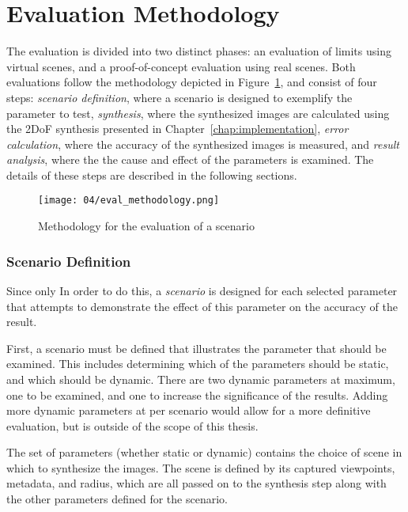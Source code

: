 
\section{Evaluation Methodology}
The evaluation is divided into two distinct phases: an evaluation of limits using virtual scenes, and a proof-of-concept evaluation using real scenes. Both evaluations follow the methodology depicted in Figure~\ref{fig:eval-methodology}, and consist of four steps: \emph{scenario definition}, where a scenario is designed to exemplify the parameter to test, \emph{synthesis}, where the synthesized images are calculated using the 2DoF synthesis presented in Chapter~\ref{chap:implementation}, \emph{error calculation}, where the accuracy of the synthesized images is measured, and \emph{result analysis}, where the the cause and effect of the parameters is examined. The details of these steps are described in the following sections.

\begin{figure}
		\centering
		\texttt{[image: 04/eval\_methodology.png]}
		\caption{Methodology for the evaluation of a scenario}
		\label{fig:eval-methodology}
\end{figure}

\subsubsection{Scenario Definition}
Since only In order to do this, a \emph{scenario} is designed for each selected parameter that attempts to demonstrate the effect of this parameter on the accuracy of the result.

First, a scenario must be defined that illustrates the parameter that should be examined. This includes determining which of the parameters should be static, and which should be dynamic. There are two dynamic parameters at maximum, one to be examined, and one to increase the significance of the results. Adding more dynamic parameters at per scenario would allow for a more definitive evaluation, but is outside of the scope of this thesis.

The set of parameters (whether static or dynamic) contains the choice of scene in which to synthesize the images. The scene is defined by its captured viewpoints, metadata, and radius, which are all passed on to the synthesis step along with the other parameters defined for the scenario.

